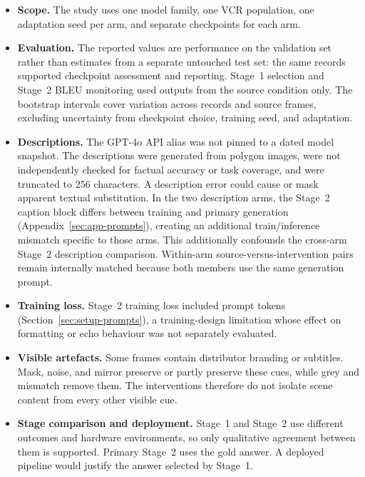 \begin{itemize}
  \item \textbf{Scope.} The study uses one model family, one VCR population,
        one adaptation seed per arm, and separate checkpoints for each arm.

  \item \textbf{Evaluation.} The reported values are performance on the
        validation set rather than estimates from a separate untouched test
        set: the same records supported checkpoint assessment and reporting.
        Stage~1 selection and Stage~2 BLEU monitoring used outputs from the
        source condition only. The bootstrap intervals cover variation across
        records and source frames, excluding uncertainty from checkpoint
        choice, training seed, and adaptation.

  \item \textbf{Descriptions.} The GPT-4o API alias was not pinned to a dated
        model snapshot. The descriptions were generated from polygon images,
        were not independently checked for factual accuracy or task coverage,
        and were truncated to 256 characters. A description error could cause
        or mask apparent textual substitution. In the two description arms,
        the Stage~2 caption block differs between training and primary
        generation (Appendix~\ref{sec:app-prompts}), creating an additional
        train/inference mismatch specific to those arms. This additionally
        confounds the cross-arm Stage~2 description comparison. Within-arm
        source-versus-intervention pairs remain internally matched because
        both members use the same generation prompt.

  \item \textbf{Training loss.} Stage~2 training loss included prompt tokens
        (Section~\ref{sec:setup-prompts}), a training-design limitation whose
        effect on formatting or echo behaviour was not separately evaluated.

  \item \textbf{Visible artefacts.} Some frames contain distributor branding or
        subtitles. Mask, noise, and mirror preserve or partly preserve these
        cues, while grey and mismatch remove them. The interventions therefore
        do not isolate scene content from every other visible cue.

  \item \textbf{Stage comparison and deployment.} Stage~1 and Stage~2 use
        different outcomes and hardware environments, so only qualitative
        agreement between them is supported. Primary Stage~2 uses the gold
        answer. A deployed pipeline would justify the answer selected by
        Stage~1.


\end{itemize}
